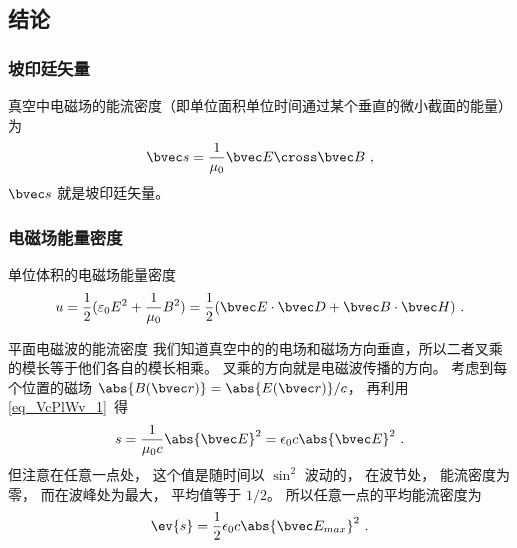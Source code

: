 



\subsection{结论}

\subsubsection{坡印廷矢量}
真空中电磁场的能流密度（即单位面积单位时间通过某个垂直的微小截面的能量）为 %
\begin{equation}
\bvec s = \frac{1}{\mu_0} \bvec E \cross \bvec B~,
\end{equation} 
$\bvec s$ 就是坡印廷矢量。

\subsubsection{电磁场能量密度}
单位体积的电磁场能量密度\cite{GriffE}
\begin{equation}
u=\frac{1}{2}(\varepsilon_0 E^2+ \frac{1}{\mu_0} B^2)=\frac{1}{2} (\bvec E \cdot \bvec D + \bvec B \cdot \bvec H)~.
\end{equation} 

\begin{example}{平面电磁波的能流密度}\label{ex_EBS_1}
我们知道真空中的的电场和磁场方向垂直，所以二者叉乘的模长等于他们各自的模长相乘。 叉乘的方向就是电磁波传播的方向。 考虑到每个位置的磁场 $\abs{B(\bvec r)} = \abs{E(\bvec r)}/c$， 再利用\autoref{eq_VcPlWv_1}~得
\begin{equation}
s = \frac{1}{\mu_0 c} \abs{\bvec E}^2 = \epsilon_0 c \abs{\bvec E}^2~.
\end{equation}
但注意在任意一点处， 这个值是随时间以 $\sin^2$ 波动的， 在波节处， 能流密度为零， 而在波峰处为最大， 平均值等于 $1/2$。 %
所以任意一点的平均能流密度为
\begin{equation}
\ev{s} = \frac{1}{2} \epsilon_0 c \abs{\bvec E_{max}}^2~.
\end{equation}
\end{example}

